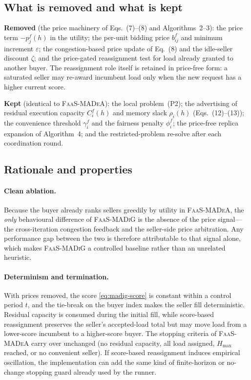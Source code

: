 \subsection{What is removed and what is kept}
\label{sec:madig-ablation}

\noindent\textbf{Removed} (the price machinery of Eqs.~(7)--(8) and
Algorithms~2--3): the price term $-p_j^f(h)$ in the utility; the per-unit
bidding price $b_{ij}^f$ and minimum increment $\varepsilon$; the
congestion-based price update of Eq.~(8) and the idle-seller discount $\zeta$;
and the price-gated reassignment test for load already granted to another
buyer. The reassignment role itself is retained in price-free form: a saturated
seller may re-award incumbent load only when the new request has a higher
current score.

\noindent\textbf{Kept} (identical to \textsc{FaaS-MADeA}): the local
problem~(P2); the advertising of residual execution capacity $C_i^f(h)$ and
memory slack $\rho_i(h)$ (Eqs.~(12)--(13)); the convenience threshold
$\gamma_i^f$ and the fairness penalty $\phi_i^f$; the price-free replica
expansion of Algorithm~4; and the restricted-problem re-solve after each
coordination round.

\subsection{Rationale and properties}
\label{sec:madig-rationale}

\paragraph{Clean ablation.} Because the buyer already ranks sellers greedily by
utility in \textsc{FaaS-MADeA}, the \emph{only} behavioural difference of
\textsc{FaaS-MADiG} is the absence of the price signal---the cross-iteration
congestion feedback and the seller-side price arbitration. Any performance gap
between the two is therefore attributable to that signal alone, which makes
\textsc{FaaS-MADiG} a controlled baseline rather than an unrelated heuristic.

\paragraph{Determinism and termination.} With prices removed, the score
\eqref{eq:madig-score} is constant within a control period $t$, and the
tie-break on the buyer index makes the seller fill deterministic. Residual
capacity is consumed during the initial fill, while score-based reassignment
preserves the seller's accepted-load total but may move load from a lower-score
incumbent to a higher-score buyer. The stopping criteria of
\textsc{FaaS-MADeA} carry over unchanged (no residual capacity, all load
assigned, $H_{\max}$ reached, or no convenient seller). If score-based
reassignment induces empirical oscillation, the implementation can add the same
kind of finite-horizon or no-change stopping guard already used by the runner.

